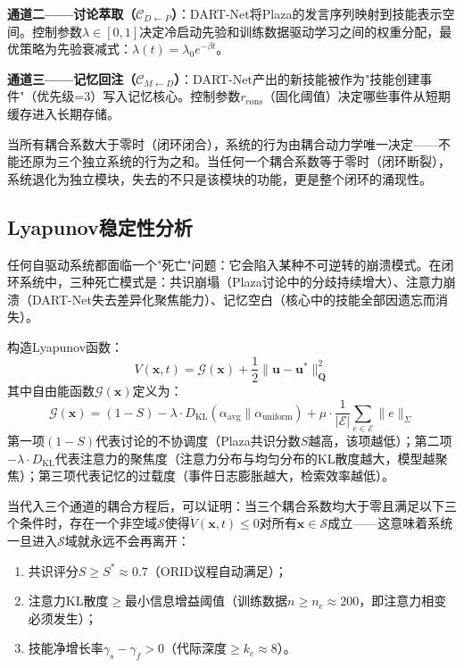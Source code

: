\documentclass[12pt,a4paper]{ctexart}
\def\cC{\mathcal{C}}
\def\cE{\mathcal{E}}
\def\cG{\mathcal{G}}
\begin{document}
\textbf{通道二——讨论萃取（$\cC_{D \leftarrow P}$）}：DART-Net将Plaza的发言序列映射到技能表示空间。控制参数$\lambda \in [0,1]$决定冷启动先验和训练数据驱动学习之间的权重分配，最优策略为先验衰减式：$\lambda(t) = \lambda_0 e^{-\beta t}$。

\textbf{通道三——记忆回注（$\cC_{M \leftarrow D}$）}：DART-Net产出的新技能被作为"技能创建事件"（优先级=3）写入记忆核心。控制参数$r_{\text{cons}}$（固化阈值）决定哪些事件从短期缓存进入长期存储。

当所有耦合系数大于零时（闭环闭合），系统的行为由耦合动力学唯一决定——不能还原为三个独立系统的行为之和。当任何一个耦合系数等于零时（闭环断裂），系统退化为独立模块，失去的不只是该模块的功能，更是整个闭环的涌现性。

\subsection{Lyapunov稳定性分析}

任何自驱动系统都面临一个"死亡"问题：它会陷入某种不可逆转的崩溃模式。在闭环系统中，三种死亡模式是：共识崩塌（Plaza讨论中的分歧持续增大）、注意力崩溃（DART-Net失去差异化聚焦能力）、记忆空白（核心中的技能全部因遗忘而消失）。

构造Lyapunov函数：
\begin{equation}
V(\mathbf{x}, t) = \cG(\mathbf{x}) + \frac{1}{2}\|\mathbf{u} - \mathbf{u}^*\|^2_{\mathbf{Q}}
\label{eq:lyapunov}
\end{equation}
其中自由能函数$\cG(\mathbf{x})$定义为：
\begin{equation}
\cG(\mathbf{x}) = (1 - S) - \lambda \cdot D_{\text{KL}}(\alpha_{\text{avg}} \parallel \alpha_{\text{uniform}}) + \mu \cdot \frac{1}{|\cE|}\sum_{e\in \cE} \|e\|_\Sigma
\label{eq:free_energy}
\end{equation}
第一项$(1-S)$代表讨论的不协调度（Plaza共识分数$S$越高，该项越低）；第二项$-\lambda \cdot D_{\text{KL}}$代表注意力的聚焦度（注意力分布与均匀分布的KL散度越大，模型越聚焦）；第三项代表记忆的过载度（事件日志膨胀越大，检索效率越低）。

当代入三个通道的耦合方程后，可以证明：当三个耦合系数均大于零且满足以下三个条件时，存在一个非空域$\mathcal{S}$使得$\dot{V}(\mathbf{x}, t) \leq 0$对所有$\mathbf{x} \in \mathcal{S}$成立——这意味着系统一旦进入$\mathcal{S}$域就永远不会再离开：

\begin{enumerate}[nosep]
\item 共识评分$S \geq S^* \approx 0.7$（ORID议程自动满足）；
\item 注意力KL散度$\geq$最小信息增益阈值（训练数据$n \geq n_c \approx 200$，即注意力相变必须发生）；
\item 技能净增长率$\gamma_s - \gamma_f > 0$（代际深度$\geq k_c \approx 8$）。
\end{enumerate}
\end{document}
